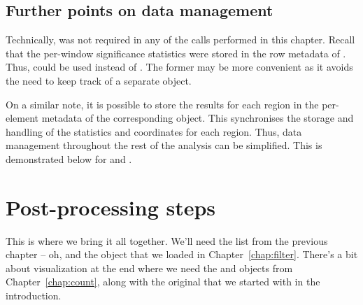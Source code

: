 \documentclass{report}\usepackage[]{graphicx}\usepackage[usenames,dvipsnames]{color}
\newcommand{\hlopt}[1]{\textcolor[rgb]{0,0,0}{#1}}%
\newcommand{\hlstd}[1]{\textcolor[rgb]{0.251,0.251,0.251}{#1}}%
\newcommand{\hlkwb}[1]{\textcolor[rgb]{0,0,0}{#1}}%
\newcommand{\hlkwd}[1]{\textcolor[rgb]{0.878,0.439,0.125}{#1}}%
\newenvironment{knitrout}{}{} %
\newenvironment{combox}
{ \definecolor{shadecolor}{RGB}{255, 240, 240} \begin{shaded}\begin{center}\begin{minipage}[t]{0.95\textwidth} }
{ \end{minipage}\end{center}\end{shaded} \definecolor{shadecolor}{RGB}{240,240,240} }
\begin{document}
\section{Further points on data management}
Technically,  was not required in any of the calls performed in this chapter.
Recall that the per-window significance statistics were stored in the row metadata of .
Thus,  could be used instead of .
The former may be more convenient as it avoids the need to keep track of a separate object.

On a similar note, it is possible to store the results for each region in the per-element metadata of the corresponding  object.
This synchronises the storage and handling of the statistics and coordinates for each region.
Thus, data management throughout the rest of the analysis can be simplified.
This is demonstrated below for  and .

\begin{knitrout}
\color{fgcolor}
\end{knitrout}




\chapter{Post-processing steps}

\begin{combox}
This is where we bring it all together.
We'll need the  list from the previous chapter -- oh, and the  object that we loaded in Chapter~\ref{chap:filter}.
There's a bit about visualization at the end where we need the  and  objects from Chapter~\ref{chap:count}, along with the original  that we started with in the introduction.
\end{combox}
\end{document}
